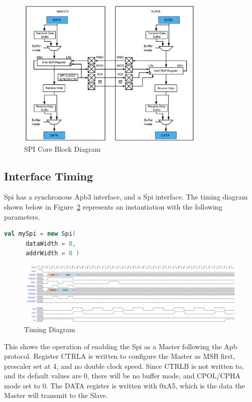 \begin{figure}[H]
    \centering
    \includegraphics[width=0.8\textwidth]{images/spi_block_diagram.png}
    \caption{SPI Core Block Diagram}
    \label{fig:spi_block_diagram}
\end{figure}

\subsection{Interface Timing}

Spi has a synchronous Apb3 interface, and a Spi interface. The timing diagram shown below
in Figure~\ref{fig:timing} represents an instantiation with the following
parameters.

\begin{lstlisting}[language=Scala]
    val mySpi = new Spi(
      dataWidth = 8, 
      addrWidth = 8 ) 
\end{lstlisting}
    
\begin{figure}[h]
    \includegraphics[width=\textwidth]{images/wavedrom.png}
    \caption{Timing Diagram}\label{fig:timing}
  \end{figure}

This shows the operation of enabling the Spi as a Master following the Apb protocol. Register CTRLA is written to configure the Master
as MSB first, prescaler set at 4, and no double clock speed. Since CTRLB is not written to, and its default values are 0, there will be no buffer mode, 
and CPOL/CPHA mode set to 0. The DATA register is written with 0xA5, which is the data the Master will transmit to the Slave. 


